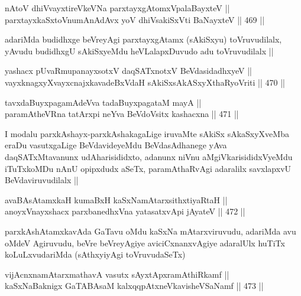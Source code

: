 \begin{shl}
nAtoV dhiVvayxtireVkeVNa parxtayxgAtomxVpalaBayxteV || \\
parxtayxkaSxtoV\s numAnAdAvx yoV dhiVsakiSxVti BaNayxteV ||  469 ||  
\end{shl}

\begin{artha}
adariMda budidhxge beVreyAgi parxtayxgAtamx (sAkiSxyu) toVruvudilalx, yAvudu budidhxgU sAkiSxyeMdu heVLalapxDuvudo adu toVruvudilalx ||
\end{artha}

\begin{shl}
yashacx pUvaRmupanayxsotxV daqSATxnotxV BeVdasidadhxyeV || \\
vayxknagxyXvayxcnajxkavadeBxVdaH sAkiSxsAkASxyXthaRyoVriti ||  470 ||  
\end{shl}
				
\begin{shl}
tavxdaBuyxpagamAdeVva tadaBuyxpagataM mayA || \\
paramAtheVRna tatArxpi neYva BeVdoV\s sitx kashacxna ||  471 ||  
\end{shl}

\begin{artha}
I modalu parxkAshayx-parxkAshakagaLige iruvaMte sAkiSx sAkaSxyXveMba eraDu vasutxgaLige BeVdavideyeMdu BeVdasAdhanege yAva daqSATxMtavanunx udAharisididxto, adanunx niVnu aMgiVkarisididxVyeMdu iTuTxkoMDu nAnU opipxdudx aSeTx, paramAthaRvAgi adaralilx savxlapxvU BeVdaviruvudilalx ||
\end{artha}


\begin{shl}
avaBAsAtamxkaH kumaBxH kaSxNamAtarxsithxtiyaRtaH || \\
anoyxV\s nayxshacx parxbanedhxVna yatasatxvApi jAyateV ||  472 ||  
\end{shl}

\begin{artha}
parxkAshAtamxkavAda GaTavu oMdu kaSxNa mAtarxviruvudu, adariMda avu oMdeV Agiruvudu, beVre beVreyAgiye aviciCxnanxvAgiye adaralUlx huTiTx koLuLxvudariMda (sAthxyiyAgi toVruvudaSeTx) 
\end{artha}


\begin{shl}
vijAcnxnamAtarxmathavA vasutx sAyxtApxramAthiRkamf || \\
kaSxNaBaknigx GaTABAsaM kalxqqpAtxneVkavisheVSaNamf ||  473 ||  
\end{shl}

